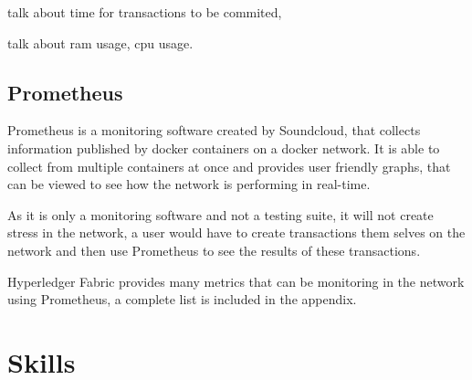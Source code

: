 talk about time for transactions to be commited,

talk about ram usage, cpu usage.

\subsection{Prometheus}

Prometheus is a monitoring software created by Soundcloud, that collects information published by docker containers on a docker network. It is able to collect from multiple containers at once and provides user friendly graphs, that can be viewed to see how the network is performing in real-time.

As it is only a monitoring software and not a testing suite, it will not create stress in the network, a user would have to create transactions them selves on the network and then use Prometheus to see the results of these transactions.

Hyperledger Fabric provides many metrics that can be monitoring in the network using Prometheus, a complete list is included in the appendix.




\section{Skills}

